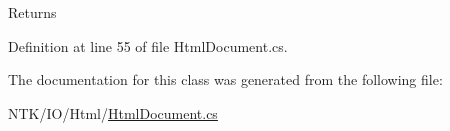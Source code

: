 \begin{DoxyReturn}{Returns}

\end{DoxyReturn}


Definition at line 55 of file Html\+Document.\+cs.



The documentation for this class was generated from the following file\+:\begin{DoxyCompactItemize}
\item 
N\+T\+K/\+I\+O/\+Html/\mbox{\hyperlink{_html_document_8cs}{Html\+Document.\+cs}}\end{DoxyCompactItemize}
